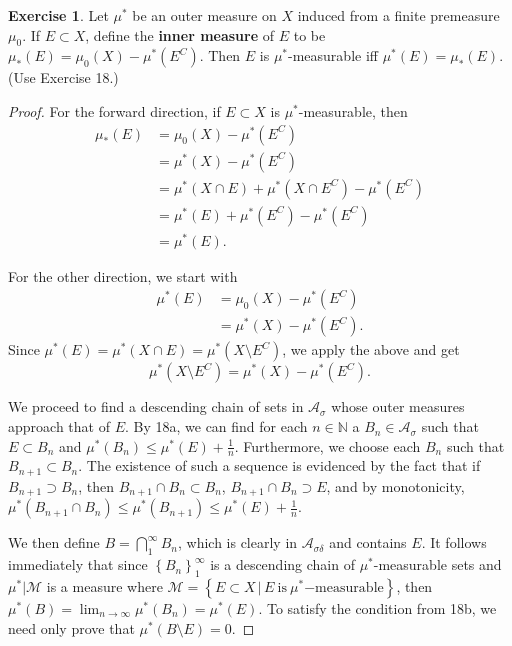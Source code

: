 \documentclass{article}
\theoremstyle{definition}
\newtheorem{ex}{Exercise}
\begin{document}
\begin{ex}
	Let $\mu^*$ be an outer measure on $X$ induced from a finite premeasure $\mu_0$.
	If $E \subset X$, define the \textbf{inner measure} of $E$ to be $\mu_*(E) = \mu_0(X) - \mu^*(E^C)$.
	Then $E$ is $\mu^*$-measurable iff $\mu^*(E) = \mu_*(E)$. (Use Exercise 18.)
\end{ex}
\begin{proof}
	For the forward direction, if $E \subset X$ is $\mu^*$-measurable, then \begin{align*}
		\mu_*(E) & = \mu_0(X) - \mu^*(E^C)                            \\
		         & = \mu^*(X) - \mu^*(E^C)                            \\
		         & = \mu^*(X \cap E) + \mu^*(X \cap E^C) - \mu^*(E^C) \\
		         & = \mu^*(E) + \mu^*(E^C) - \mu^*(E^C)               \\
		         & = \mu^*(E).
	\end{align*}

	For the other direction, we start with \begin{align*}
		\mu^*(E) & = \mu_0(X) - \mu^*(E^C)  \\
		         & = \mu^*(X) - \mu^*(E^C).
	\end{align*}
	Since $\mu^*(E) = \mu^*(X \cap E) = \mu^*(X \setminus E^C)$, we apply the above and get \begin{equation*}
		\mu^*(X \setminus E^C) = \mu^*(X) - \mu^*(E^C).
	\end{equation*}

	We proceed to find a descending chain of sets in $\mathscr{A}_\sigma$ whose outer measures approach that of $E$.
	By 18a, we can find for each $n \in \mathbb{N}$ a $B_n \in \mathscr{A}_\sigma$ such that $E \subset B_n$ and $\mu^*(B_n) \leq \mu^*(E) + \frac{1}{n}$.
	Furthermore, we choose each $B_n$ such that $B_{n + 1} \subset B_n$.
	The existence of such a sequence is evidenced by the fact that if $B_{n + 1} \supset B_n$, then  $B_{n + 1} \cap B_n \subset B_n$, $B_{n + 1} \cap B_n \supset E$, and by monotonicity, $\mu^*(B_{n + 1} \cap B_n) \leq \mu^*(B_{n + 1}) \leq \mu^*(E) + \frac{1}{n}$.

	We then define $B = \bigcap_1^\infty B_n$, which is clearly in $\mathscr{A}_{\sigma\delta}$ and contains $E$.
	It follows immediately that since $\left\lbrace B_n \right\rbrace_1^\infty$ is a descending chain of $\mu^*$-measurable sets and $\mu^*|\mathscr{M}$ is a measure where $\mathscr{M} = \left\lbrace E \subset X \, |\, E\ \mathrm{is}\ \mu^*\mathrm{-measurable} \right\rbrace$, then $\mu^*(B) = \lim_{n \to \infty} \mu^*(B_n) = \mu^*(E)$.
	To satisfy the condition from 18b, we need only prove that $\mu^*(B \setminus E) = 0$.


\end{proof}
\end{document}

